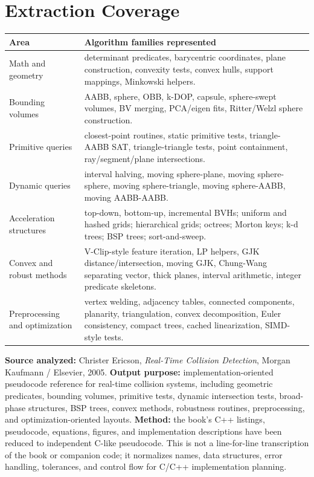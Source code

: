\documentclass[10pt,letterpaper]{article}
\begin{document}
\section*{Extraction Coverage}
\begin{longtable}{L{0.29\textwidth}L{0.66\textwidth}}
\toprule
\textbf{Area} & \textbf{Algorithm families represented}\\
\midrule
Math and geometry & determinant predicates, barycentric coordinates, plane construction, convexity tests, convex hulls, support mappings, Minkowski helpers.\\
Bounding volumes & AABB, sphere, OBB, k-DOP, capsule, sphere-swept volumes, BV merging, PCA/eigen fits, Ritter/Welzl sphere construction.\\
Primitive queries & closest-point routines, static primitive tests, triangle-AABB SAT, triangle-triangle tests, point containment, ray/segment/plane intersections.\\
Dynamic queries & interval halving, moving sphere-plane, moving sphere-sphere, moving sphere-triangle, moving sphere-AABB, moving AABB-AABB.\\
Acceleration structures & top-down, bottom-up, incremental BVHs; uniform and hashed grids; hierarchical grids; octrees; Morton keys; k-d trees; BSP trees; sort-and-sweep.\\
Convex and robust methods & V-Clip-style feature iteration, LP helpers, GJK distance/intersection, moving GJK, Chung-Wang separating vector, thick planes, interval arithmetic, integer predicate skeletons.\\
Preprocessing and optimization & vertex welding, adjacency tables, connected components, planarity, triangulation, convex decomposition, Euler consistency, compact trees, cached linearization, SIMD-style tests.\\
\bottomrule
\end{longtable}

\textbf{Source analyzed:} Christer Ericson, \emph{Real-Time Collision Detection}, Morgan Kaufmann / Elsevier, 2005. \textbf{Output purpose:} implementation-oriented pseudocode reference for real-time collision systems, including geometric predicates, bounding volumes, primitive tests, dynamic intersection tests, broad-phase structures, BSP trees, convex methods, robustness routines, preprocessing, and optimization-oriented layouts. \textbf{Method:} the book's C++ listings, pseudocode, equations, figures, and implementation descriptions have been reduced to independent C-like pseudocode. This is not a line-for-line transcription of the book or companion code; it normalizes names, data structures, error handling, tolerances, and control flow for C/C++ implementation planning.
\end{document}
